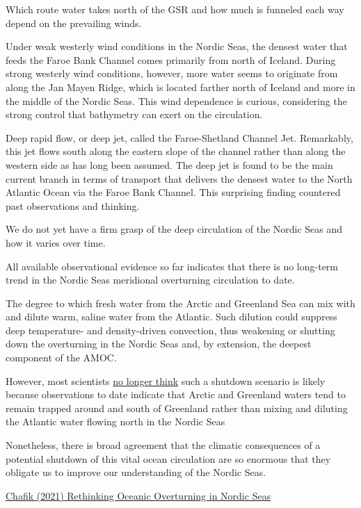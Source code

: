 \documentclass[
]{book}
\begin{document}
Which route water takes north of the GSR and how much is funneled each way depend on the prevailing winds.

Under weak westerly wind conditions in the Nordic Seas, the densest water that feeds the Faroe Bank Channel comes primarily from north of Iceland. During strong westerly wind conditions, however, more water seems to originate from along the Jan Mayen Ridge, which is located farther north of Iceland and more in the middle of the Nordic Seas. This wind dependence is curious, considering the strong control that bathymetry can exert on the circulation.

Deep rapid flow, or deep jet, called the Faroe-Shetland Channel Jet. Remarkably, this jet flows south along the eastern slope of the channel rather than along the western side as has long been assumed. The deep jet is found to be the main current branch in terms of transport that delivers the densest water to the North Atlantic Ocean via the Faroe Bank Channel. This surprising finding countered past observations and thinking.

We do not yet have a firm grasp of the deep circulation of the Nordic Seas and how it varies over time.

All available observational evidence so far indicates that there is no long-term trend in the Nordic Seas meridional overturning circulation to date.

The degree to which fresh water from the Arctic and Greenland Sea can mix with and dilute warm, saline water from the Atlantic. Such dilution could suppress deep temperature- and density-driven convection, thus weakening or shutting down the overturning in the Nordic Seas and, by extension, the deepest component of the AMOC.

However, most scientists \href{https://www.carbonbrief.org/guest-post-could-the-atlantic-overturning-circulation-shut-down}{no longer think} such a shutdown scenario is likely because observations to date indicate that Arctic and Greenland waters tend to remain trapped around and south of Greenland rather than mixing and diluting the Atlantic water flowing north in the Nordic Seas

Nonetheless, there is broad agreement that the climatic consequences of a potential shutdown of this vital ocean circulation are so enormous that they obligate us to improve our understanding of the Nordic Seas.

\href{https://eos.org/science-updates/rethinking-oceanic-overturning-in-the-nordic-seas\#.YHvKO1RSYTk.twitter}{Chafik (2021) Rethinking Oceanic Overturning in Nordic Seas}
\end{document}
